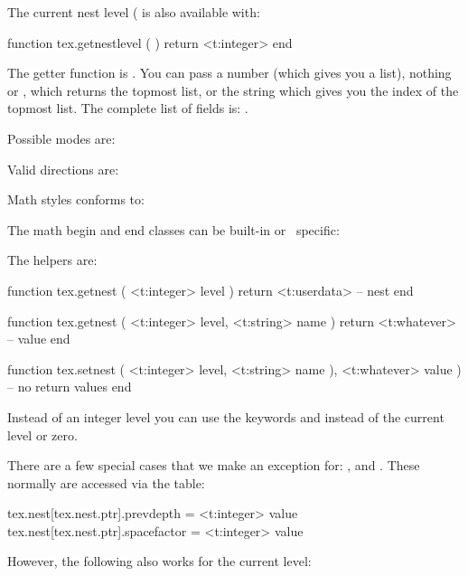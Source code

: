 \typebuffer

\start \forgetall \getbuffer
\startlinecorrection
    \box\scratchbox
\stoplinecorrection
\stop

The current nest level ( is also available with:

\starttyping[option=LUA]
function tex.getnestlevel ( )
    return <t:integer>
end
\stoptyping

The getter function is . You can pass a number (which gives
you a list), nothing or , which returns the topmost list, or the
string  which gives you the index of the topmost list. The complete list
of fields is: .

Possible modes are:

\starttworows
{}
\stoptworows

Valid directions are:

\starttworows
{}
\stoptworows

Math styles conforms to:

\starttworows
{}
\stoptworows

The math begin and end classes can be built-in or \CONTEXT\ specific:

\startfourrows
{}
\stopfourrows

The helpers are:

\starttyping[option=LUA]
function tex.getnest ( <t:integer> level )
    return <t:userdata> -- nest
end

function tex.getnest ( <t:integer> level, <t:string> name )
    return <t:whatever> -- value
end

function tex.setnest ( <t:integer> level, <t:string> name ), <t:whatever> value )
    -- no return values
end
\stoptyping

Instead of an integer level you can use the keywords  and 
instead of the current level or zero.

There are a few special cases that we make an exception for: ,
 and . These normally are accessed via the
 table:

\starttyping
tex.nest[tex.nest.ptr].prevdepth   = <t:integer> value
tex.nest[tex.nest.ptr].spacefactor = <t:integer> value
\stoptyping

However, the following also works for the current level:

